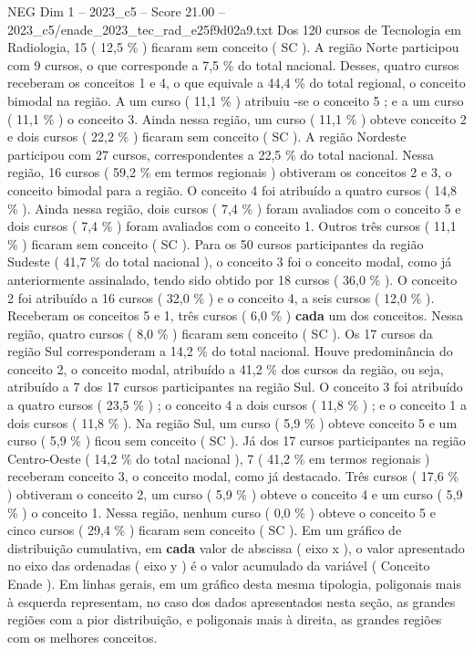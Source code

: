 \begin{textsample}{NEG Dim 1 – 2023\_c5 – Score 21.00 – 2023\_c5/enade\_2023\_tec\_rad\_e25f9d02a9.txt}
Dos 120 cursos de Tecnologia em Radiologia, 15 ( 12,5 \% ) ficaram sem conceito ( SC ).
A região Norte participou com 9 cursos, o que corresponde a 7,5 \% do total nacional.
Desses, quatro cursos receberam os conceitos 1 e 4, o que equivale a 44,4 \% do total regional, o conceito bimodal na região.
A um curso ( 11,1 \% ) atribuiu -se o conceito 5 ; e a um curso ( 11,1 \% ) o conceito 3.
Ainda nessa região, um curso ( 11,1 \% ) obteve conceito 2 e dois cursos ( 22,2 \% ) ficaram sem conceito ( SC ).
A região Nordeste participou com 27 cursos, correspondentes a 22,5 \% do total nacional.
Nessa região, 16 cursos ( 59,2 \% em termos regionais ) obtiveram os conceitos 2 e 3, o conceito bimodal para a região.
O conceito 4 foi atribuído a quatro cursos ( 14,8 \% ).
Ainda nessa região, dois cursos ( 7,4 \% ) foram avaliados com o conceito 5 e dois cursos ( 7,4 \% ) foram avaliados com o conceito 1.
Outros três cursos ( 11,1 \% ) ficaram sem conceito ( SC ).
Para os 50 cursos participantes da região Sudeste ( 41,7 \% do total nacional ), o conceito 3 foi o conceito modal, como já anteriormente assinalado, tendo sido obtido por 18 cursos ( 36,0 \% ).
O conceito 2 foi atribuído a 16 cursos ( 32,0 \% ) e o conceito 4, a seis cursos ( 12,0 \% ).
Receberam os conceitos 5 e 1, três cursos ( 6,0 \% ) \textbf{cada} um dos conceitos.
Nessa região, quatro cursos ( 8,0 \% ) ficaram sem conceito ( SC ).
Os 17 cursos da região Sul corresponderam a 14,2 \% do total nacional.
Houve predominância do conceito 2, o conceito modal, atribuído a 41,2 \% dos cursos da região, ou seja, atribuído a 7 dos 17 cursos participantes na região Sul.
O conceito 3 foi atribuído a quatro cursos ( 23,5 \% ) ; o conceito 4 a dois cursos ( 11,8 \% ) ; e o conceito 1 a dois cursos ( 11,8 \% ).
Na região Sul, um curso ( 5,9 \% ) obteve conceito 5 e um curso ( 5,9 \% ) ficou sem conceito ( SC ).
Já dos 17 cursos participantes na região Centro-Oeste ( 14,2 \% do total nacional ), 7 ( 41,2 \% em termos regionais ) receberam conceito 3, o conceito modal, como já destacado.
Três cursos ( 17,6 \% ) obtiveram o conceito 2, um curso ( 5,9 \% ) obteve o conceito 4 e um curso ( 5,9 \% ) o conceito 1.
Nessa região, nenhum curso ( 0,0 \% ) obteve o conceito 5 e cinco cursos ( 29,4 \% ) ficaram sem conceito ( SC ).
Em um gráfico de distribuição cumulativa, em \textbf{cada} valor de abscissa ( eixo x ), o valor apresentado no eixo das ordenadas ( eixo y ) é o valor acumulado da variável ( Conceito Enade ).
Em linhas gerais, em um gráfico desta mesma tipologia, poligonais mais à esquerda representam, no caso dos dados apresentados nesta seção, as grandes regiões com a pior distribuição, e poligonais mais à direita, as grandes regiões com os melhores conceitos.

\end{textsample}
